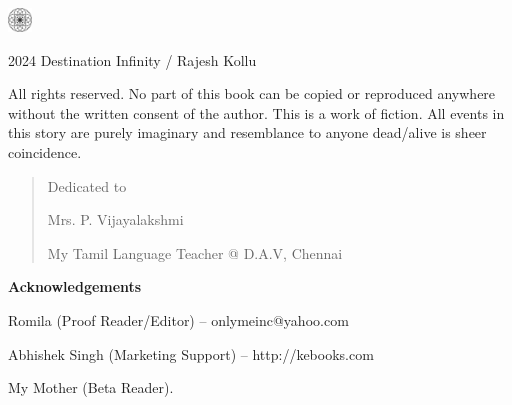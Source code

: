 \begin{center}
\HUGE{\thetitle}
\end{center}
\cleardoublepage

\begin{center}
\HUGE{\thetitle}
\end{center}

\begin{center}
\LARGE\textsf{\theauthor}
\end{center}

\vfill

\begin{center}
    \includegraphics[width=18pt]{logo.pdf}
\end{center}
\clearpage

\begingroup
\footnotesize
\setlength{\parindent}{0pt}
\setlength{\parskip}{\baselineskip}

\textcopyright{} 2024 Destination Infinity / Rajesh Kollu

All rights reserved. No part of this book can be copied or reproduced anywhere
without the written consent of the author. This is a work of fiction. All events
in this story are purely imaginary and resemblance to anyone dead/alive is sheer
coincidence.

\endgroup
\clearpage

\begin{quote}
\begin{center}Dedicated to

\LARGE
Mrs. P. Vijayalakshmi
\normalsize

My Tamil Language Teacher @ D.A.V, Chennai
\end{center}
\end{quote}

\vfill

\textbf{Acknowledgements}

Romila (Proof Reader/Editor) – onlymeinc@yahoo.com


Abhishek Singh (Marketing Support) – http://kebooks.com

My Mother (Beta Reader).


\clearpage